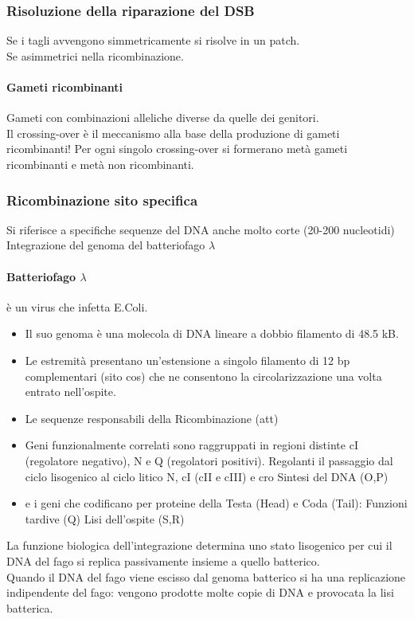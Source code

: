 \documentclass{article}
\begin{document}
\subsubsection{Risoluzione della riparazione del DSB}
Se i tagli avvengono simmetricamente si risolve in un patch.\\
Se asimmetrici nella ricombinazione.
\paragraph{Gameti ricombinanti}
Gameti con combinazioni alleliche diverse da quelle dei genitori.\\
Il crossing-over è il meccanismo alla base della produzione di gameti ricombinanti! Per ogni singolo crossing-over si formerano metà gameti ricombinanti e metà non ricombinanti.
\subsubsection{Ricombinazione sito specifica}Si riferisce a specifiche sequenze del DNA anche molto corte (20-200 nucleotidi)
Integrazione del genoma del batteriofago $\lambda$
\paragraph{Batteriofago $\lambda$} è un virus che infetta E.Coli.
\begin{itemize}
    \item Il suo genoma è una molecola di DNA lineare a dobbio filamento di 48.5 kB.
    \item Le estremità presentano un'estensione a singolo filamento di 12 bp complementari (sito cos) che ne consentono la circolarizzazione una volta entrato nell'ospite.
    \item Le sequenze responsabili della Ricombinazione (att)
    \item Geni funzionalmente correlati sono raggruppati in regioni distinte cI (regolatore negativo), N e Q (regolatori positivi).
    \subitem{-} Regolanti il passaggio dal ciclo lisogenico al ciclo litico N, cI (cII e cIII) e cro
    \subitem{-} Sintesi del DNA (O,P)
    \item e i geni che codificano per proteine della Testa (Head) e Coda (Tail):
    \subitem{-} Funzioni tardive (Q)
    \subitem{-} Lisi dell'ospite (S,R)
\end{itemize}
La funzione biologica dell'integrazione determina uno stato lisogenico per cui il DNA del fago si replica passivamente insieme a quello batterico.\\
Quando il DNA del fago viene escisso dal genoma batterico si ha una replicazione indipendente del fago: vengono prodotte molte copie di DNA e provocata la lisi batterica.
\end{document}
